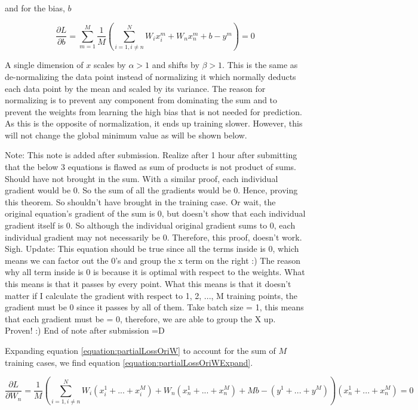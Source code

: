 \documentclass[a4paper,12pt]{article}
\begin{document}
and for the bias, $b$

\begin{equation}
\label{equation:partialLossOriB}
\frac{\partial L}{\partial b} = \sum_{m=1}^{M} \frac{1}{M} (\sum_{i = 1, i  \neq n}^{N}W_{i}x_{i}^{m} + W_{n}x_{n}^{m} + b - y^{m}) = 0
\end{equation}

A single dimension of $x$ scales by $\alpha > 1$ and shifts by $\beta > 1$. This is the same as de-normalizing the data point instead of normalizing it which normally deducts each data point by the mean and scaled by its variance. The reason for normalizing is to prevent any component from dominating the sum and to prevent the weights from learning the high bias that is not needed for prediction. As this is the opposite of normalization, it ends up training slower. However, this will not change the global minimum value as will be shown below. 

Note: This note is added after submission. Realize after 1 hour after submitting that the below 3 equations is flawed as sum of products is not product of sums. Should have not brought in the sum. With a similar proof, each individual gradient would be 0. So the sum of all the gradients would be 0. Hence, proving this theorem. So shouldn't have brought in the training case. Or wait, the original equation's gradient of the sum is 0, but doesn't show that each individual gradient itself is 0. So although the individual original gradient sums to 0, each individual gradient may not necessarily be 0. Therefore, this proof, doesn't work. Sigh.
Update: This equation should be true since all the terms inside is 0, which means we can factor out the 0's and group the x term on the right :)
The reason why all term inside is 0 is because it is optimal with respect to the weights. What this means is that it passes by every point. What this means is that it doesn't matter if I calculate the gradient with respect to {1, 2, ..., M} training points, the gradient must be 0 since it passes by all of them. Take batch size = 1, this means that each gradient must be = 0, therefore, we are able to group the X up. Proven! :) 
End of note after submission =D

Expanding equation \ref{equation:partialLossOriW} to account for the sum of $M$ training cases, we find equation \ref{equation:partialLossOriWExpand}. 

\begin{equation}
\label{equation:partialLossOriWExpand}
\frac{\partial L}{\partial W_{n}} = \frac{1}{M} (\sum_{i = 1, i  \neq n}^{N}W_{i}(x_{i}^{1} + ... + x_{i}^{M}) + W_{n}(x_{n}^{1} + ... + x_{n}^{M}) + Mb - (y^{1} + ... + y^{M}))(x_{n}^{1} + ... + x_{n}^{M}) = 0
\end{equation}
\end{document}
